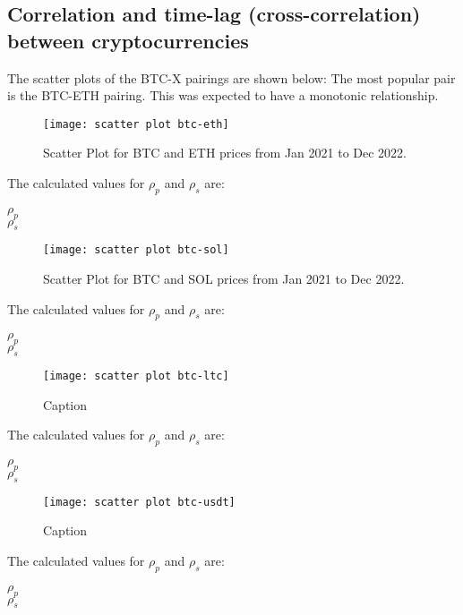 \documentclass[a4paper, 10pt, conference]{ieeeconf}      %
\begin{document}
\subsection{Correlation and time-lag (cross-correlation) between cryptocurrencies}
The scatter plots of the BTC-X pairings are shown below:
The most popular pair is the BTC-ETH pairing. This was expected to have a monotonic relationship.
\begin{figure}
    \centering
    \texttt{[image: scatter plot btc-eth]}
    \caption{Scatter Plot for BTC and ETH prices from Jan 2021 to Dec 2022.}
    \label{btc-eth}
\end{figure}
The calculated values for $\rho_p$ and $\rho_s$ are:\\
\begin{centering}
    $\rho_p$\\ 
    $\rho_s$\\ 
\end{centering}

\begin{figure}
    \centering
    \texttt{[image: scatter plot btc-sol]}
    \caption{Scatter Plot for BTC and SOL prices from Jan 2021 to Dec 2022.}
    \label{btc-sol}
\end{figure}
The calculated values for $\rho_p$ and $\rho_s$ are:\\
\begin{centering}
    $\rho_p$\\ 
    $\rho_s$\\ 
\end{centering}

\begin{figure}
    \centering
    \texttt{[image: scatter plot btc-ltc]}
    \caption{Caption}
    \label{fig:enter-label}
\end{figure}
The calculated values for $\rho_p$ and $\rho_s$ are:\\
\begin{centering}
    $\rho_p$\\ 
    $\rho_s$\\ 
\end{centering}

\begin{figure}
    \centering
    \texttt{[image: scatter plot btc-usdt]}
    \caption{Caption}
    \label{fig:enter-label}
\end{figure}
The calculated values for $\rho_p$ and $\rho_s$ are:\\
\begin{centering}
    $\rho_p$\\ 
    $\rho_s$\\ 
\end{centering}
\end{document}
